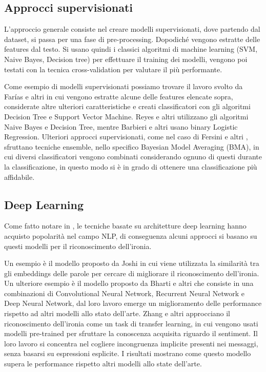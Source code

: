 \documentclass[oneside]{book}
\begin{document}
\subsection{Approcci supervisionati}
L'approccio generale consiste nel creare modelli supervisionati, dove partendo dal dataset, si passa per una fase di pre-processing. Dopodiché vengono estratte delle features dal testo. Si usano quindi i classici algoritmi di machine learning (SVM, Naive Bayes, Decision tree) per effettuare il training dei modelli, vengono poi testati con la tecnica cross-validation per valutare il più performante.

Come esempio di modelli supervisionati possiamo trovare il lavoro svolto da Farías e altri \cite{farias} in cui vengono estratte alcune delle features elencate sopra, considerate altre ulteriori caratteristiche e creati classificatori con gli algoritmi Decision Tree e Support Vector Machine. Reyes e altri \cite{reyes} utilizzano gli algoritmi Naive Bayes e Decision Tree, mentre Barbieri e altri \cite{sarcasm-ita} usano binary Logistic Regression.
Ulteriori approcci supervisionati, come nel caso di Fersini e altri \cite{fersini}, sfruttano tecniche ensemble, nello specifico Bayesian Model Averaging (BMA), in cui diversi classificatori vengono combinati considerando ognuno di questi durante la classificazione, in questo modo si è in grado di ottenere una classificazione più affidabile.



\subsection{Deep Learning}
Come fatto notare in \cite{survey5}, le tecniche basate su architetture deep learning hanno acquisto popolarità nel campo NLP, di conseguenza alcuni approcci si basano su questi modelli per il riconoscimento dell'ironia.

Un esempio è il modello proposto da Joshi \cite{embeddings} in cui viene utilizzata la similarità tra gli embeddings delle parole per cercare di migliorare il riconoscimento dell'ironia. Un ulteriore esempio è il modello proposto da Bharti e altri \cite{deep-learning} che consiste in una combinazioni di Convolutional Neural Network, Recurrent Neural Network e Deep Neural Network, dal loro lavoro emerge un miglioramento delle performance rispetto ad altri modelli allo stato dell'arte. Zhang e altri \cite{zang} approcciano il riconoscimento dell'ironia come un task di transfer learning, in cui vengono usati modelli pre-trained per sfruttare la conoscenza acquisita riguardo il sentiment. Il loro lavoro si concentra nel cogliere incongruenza implicite presenti nei messaggi, senza basarsi su espressioni esplicite. I risultati mostrano come questo modello supera le performance rispetto altri modelli allo state dell'arte.
\end{document}
